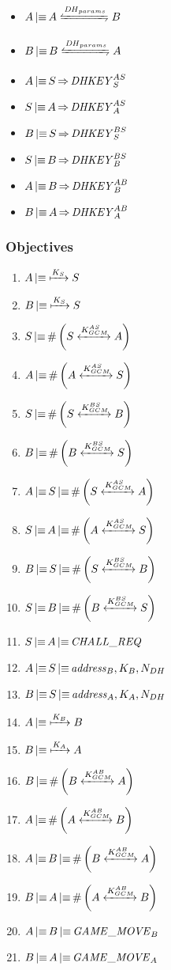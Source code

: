 \begin{itemize}
	\item \(A \believes A \secret{\mathit{DH}_{params}} B\)
	\item \(B \believes B \secret{\mathit{DH}_{params}} A\)
	\item \(A \operatorname{\mid\equiv} S \operatorname{\Rightarrow} \mathit{DHKEY}_S^{AS}\)
	\item \(S \operatorname{\mid\equiv} A \operatorname{\Rightarrow} \mathit{DHKEY}_A^{AS}\)
	\item \(B \operatorname{\mid\equiv} S \operatorname{\Rightarrow} \mathit{DHKEY}_S^{BS}\)
	\item \(S \operatorname{\mid\equiv} B \operatorname{\Rightarrow} \mathit{DHKEY}_B^{BS}\)
	\item \(A \operatorname{\mid\equiv} B \operatorname{\Rightarrow} \mathit{DHKEY}_B^{AB}\)
	\item \(B \operatorname{\mid\equiv} A \operatorname{\Rightarrow} \mathit{DHKEY}_A^{AB}\)
\end{itemize}

\subsubsection{Objectives}

\begin{enumerate}
	\item \(A \operatorname{\mid\equiv} \xmapsto{K_S} S\)
	\item \(B \operatorname{\mid\equiv} \xmapsto{K_S} S\)
	\item \(S \operatorname{\mid\equiv} \#\left(S \xleftrightarrow{K_{GCM}^{AS}} A\right)\)
	\item \(A \operatorname{\mid\equiv} \#\left(A \xleftrightarrow{K_{GCM}^{AS}} S\right)\)
	\item \(S \operatorname{\mid\equiv} \#\left(S \xleftrightarrow{K_{GCM}^{BS}} B\right)\)
	\item \(B \operatorname{\mid\equiv} \#\left(B \xleftrightarrow{K_{GCM}^{BS}} S\right)\)
	\item \(A \operatorname{\mid\equiv} S \operatorname{\mid\equiv} \#\left(S \xleftrightarrow{K_{GCM}^{AS}} A\right)\)
	\item \(S \operatorname{\mid\equiv} A \operatorname{\mid\equiv} \#\left(A \xleftrightarrow{K_{GCM}^{AS}} S\right)\)
	\item \(B \operatorname{\mid\equiv} S \operatorname{\mid\equiv} \#\left(S \xleftrightarrow{K_{GCM}^{BS}} B\right)\)
	\item \(S \operatorname{\mid\equiv} B \operatorname{\mid\equiv} \#\left(B \xleftrightarrow{K_{GCM}^{BS}} S\right)\)
	\item \(S \operatorname{\mid\equiv} A \operatorname{\mid\equiv} \mathit{CHALL\_REQ}\)
	\item \(A \operatorname{\mid\equiv} S \operatorname{\mid\equiv} \mathit{address}_B, K_B, N_{DH}\)
	\item \(B \operatorname{\mid\equiv} S \operatorname{\mid\equiv} \mathit{address}_A, K_A, N_{DH}\)
	\item \(A \operatorname{\mid\equiv} \xmapsto{K_B} B\)
	\item \(B \operatorname{\mid\equiv} \xmapsto{K_A} A\)
	\item \(B \operatorname{\mid\equiv} \#\left(B \xleftrightarrow{K_{GCM}^{AB}} A\right)\)
	\item \(A \operatorname{\mid\equiv} \#\left(A \xleftrightarrow{K_{GCM}^{AB}} B\right)\)
	\item \(A \operatorname{\mid\equiv} B \operatorname{\mid\equiv} \#\left(B \xleftrightarrow{K_{GCM}^{AB}} A\right)\)
	\item \(B \operatorname{\mid\equiv} A \operatorname{\mid\equiv} \#\left(A \xleftrightarrow{K_{GCM}^{AB}} B\right)\)
	\item \(A \operatorname{\mid\equiv} B \operatorname{\mid\equiv} \mathit{GAME\_MOVE}_B\)
	\item \(B \operatorname{\mid\equiv} A \operatorname{\mid\equiv} \mathit{GAME\_MOVE}_A\)
\end{enumerate}

